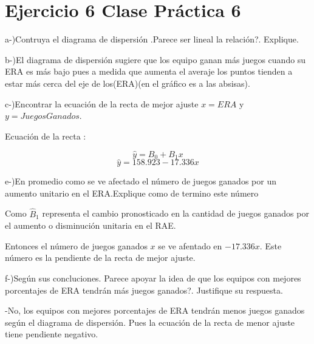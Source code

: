 \documentclass{article}
\begin{document}
	\section*{Ejercicio 6 Clase Pr\'actica 6 }

		\begin{flushleft}
			a-)Contruya el diagrama de dispersi\'on .Parece ser lineal la relaci\'on?. Explique.
		\end{flushleft}

		\begin{flushleft}
			b-)El diagrama de dispersi\'on sugiere que los equipo ganan m\'as juegos cuando su ERA es m\'as bajo pues a medida que aumenta el averaje los puntos tienden a estar m\'as cerca del eje de los(ERA)(en el gr\'afico es a las absisas).
		\end{flushleft}

		\begin{flushleft}
			c-)Encontrar la ecuaci\'on de la recta de mejor ajuste $x = ERA$ y $y = Juegos Ganados$.
		\end{flushleft}

		\begin{flushleft}
			Ecuaci\'on de la recta :
		\end{flushleft}
		$$ \hat y = B_{0} + B_{1}x$$
		$$ \hat y = 158.923 - 17.336 x$$

		\begin{flushleft}
			e-)En promedio como se ve afectado el n\'umero de juegos ganados por un aumento unitario en el ERA.Explique como de termino este n\'umero 
		\end{flushleft}

		\begin{flushleft}
			Como $\hat B_{1}$ representa el cambio pronosticado en la cantidad de juegos ganados por el aumento o disminuci\'on unitaria en el RAE.
		\end{flushleft}

		\begin{flushleft}
			Entonces el n\'umero de juegos ganados $x$ se ve afentado en $-17.336 x$. Este n\'umero es la pendiente de la recta de mejor ajuste.
		\end{flushleft}

		\begin{flushleft}
			f-)Seg\'un sus concluciones. \textquestiondown Parece apoyar la idea de que los equipos con mejores porcentajes de ERA tendr\'an m\'as juegos ganados?. Justifique su respuesta. 
		\end{flushleft}

		\begin{flushleft}
			-No, los equipos con mejores porcentajes de ERA tendr\'an menos juegos ganados seg\'un el diagrama de dispersi\'on. Pues la ecuaci\'on de la recta de menor ajuste tiene pendiente negativo.
		\end{flushleft}
\end{document}

